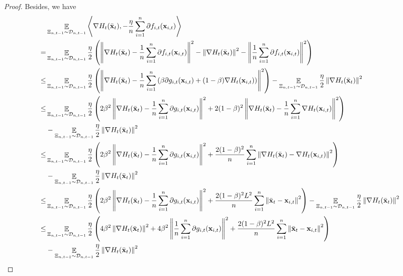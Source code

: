 \documentclass{article}
\begin{document}
\begin{proof}
Besides, we have
\begin{align}
\nonumber
& \EE_{ \Xi_{n,t-1} \sim \Dcal_{n,t-1} } \lrangle{\nabla H_t(\bar{\x}_t), -\frac{\eta}{n}\sum_{i=1}^n \partial f_{i,t}(\x_{i,t})} \\ \nonumber
= & \EE_{ \Xi_{n,t-1} \sim \Dcal_{n,t-1} } \frac{\eta}{2}\lrincir{ \lrnorm{\nabla H_t(\bar{\x}_t) -\frac{1}{n}\sum_{i=1}^n \partial f_{i,t}(\x_{i,t})}^2 - \lrnorm{\nabla H_t(\bar{\x}_t)}^2 - \lrnorm{\frac{1}{n}\sum_{i=1}^n \partial f_{i,t}(\x_{i,t})}^2 } \\ \nonumber
\le & \EE_{ \Xi_{n,t-1} \sim \Dcal_{n,t-1} } \frac{\eta}{2}\lrincir{ \lrnorm{\nabla H_t(\bar{\x}_t) -\frac{1}{n}\sum_{i=1}^n \lrincir{\beta \partial g_{i,t}(\x_{i,t}) + (1-\beta) \nabla H_t(\x_{i,t}) } }^2 }  - \EE_{ \Xi_{n,t-1} \sim \Dcal_{n,t-1} } \frac{\eta}{2} \lrnorm{\nabla H_t(\bar{\x}_t)}^2  \\ \nonumber
\le & \EE_{ \Xi_{n,t-1} \sim \Dcal_{n,t-1} } \frac{\eta}{2}\lrincir{ 2\beta^2 \lrnorm{\nabla H_t(\bar{\x}_t) -\frac{1}{n}\sum_{i=1}^n \partial g_{i,t}(\x_{i,t})}^2 + 2(1-\beta)^2 \lrnorm{ \nabla H_t(\bar{\x}_t) - \frac{1}{n}\sum_{i=1}^n\nabla H_t(\x_{i,t}) }^2 } \\ \nonumber 
& - \EE_{ \Xi_{n,t-1} \sim \Dcal_{n,t-1} } \frac{\eta}{2} \lrnorm{\nabla H_t(\bar{\x}_t)}^2  \\ \nonumber
\le & \EE_{ \Xi_{n,t-1} \sim \Dcal_{n,t-1} } \frac{\eta}{2}\lrincir{ 2\beta^2 \lrnorm{\nabla H_t(\bar{\x}_t) -\frac{1}{n}\sum_{i=1}^n \partial g_{i,t}(\x_{i,t})}^2 + \frac{2(1-\beta)^2}{n}\sum_{i=1}^n \lrnorm{ \nabla H_t(\bar{\x}_t) - \nabla H_t(\x_{i,t}) }^2 } \\ \nonumber 
& - \EE_{ \Xi_{n,t-1} \sim \Dcal_{n,t-1} } \frac{\eta}{2} \lrnorm{\nabla H_t(\bar{\x}_t)}^2  \\ \nonumber
\le & \EE_{ \Xi_{n,t-1} \sim \Dcal_{n,t-1} } \frac{\eta}{2}\lrincir{ 2\beta^2 \lrnorm{\nabla H_t(\bar{\x}_t) -\frac{1}{n}\sum_{i=1}^n \partial g_{i,t}(\x_{i,t})}^2 + \frac{2(1-\beta)^2L^2}{n}\sum_{i=1}^n \lrnorm{ \bar{\x}_t - \x_{i,t} }^2 }  - \EE_{ \Xi_{n,t-1} \sim \Dcal_{n,t-1} } \frac{\eta}{2} \lrnorm{\nabla H_t(\bar{\x}_t)}^2  \\ \nonumber
\le & \EE_{ \Xi_{n,t-1} \sim \Dcal_{n,t-1} } \frac{\eta}{2}\lrincir{ 4\beta^2 \lrnorm{\nabla H_t(\bar{\x}_t)}^2  + 4\beta^2 \lrnorm{\frac{1}{n}\sum_{i=1}^n \partial g_{i,t}(\x_{i,t})}^2 + \frac{2(1-\beta)^2L^2}{n}\sum_{i=1}^n \lrnorm{ \bar{\x}_t - \x_{i,t} }^2 } \\ \nonumber 
& - \EE_{ \Xi_{n,t-1} \sim \Dcal_{n,t-1} } \frac{\eta}{2} \lrnorm{\nabla H_t(\bar{\x}_t)}^2 \\ \label{equa_lemma_gradient_norm_temp1}

\end{align}
\end{proof}
\end{document}
